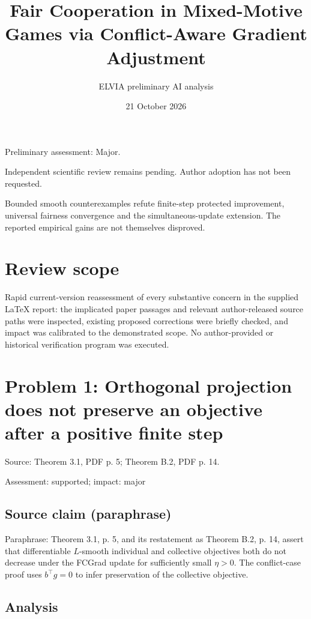 \documentclass[11pt]{article}
\begin{document}
\title{Fair Cooperation in Mixed-Motive Games via Conflict-Aware Gradient Adjustment}

\author{ELVIA preliminary AI analysis}\date{21 October 2026}\maketitle

Preliminary assessment: Major.\par

Independent scientific review remains pending. Author adoption has not been requested.

Bounded smooth counterexamples refute finite-step protected improvement, universal fairness convergence and the simultaneous-update extension. The reported empirical gains are not themselves disproved.

\section*{Review scope}

Rapid current-version reassessment of every substantive concern in the supplied LaTeX report: the implicated paper passages and relevant author-released source paths were inspected, existing proposed corrections were briefly checked, and impact was calibrated to the demonstrated scope. No author-provided or historical verification program was executed.

\section*{Problem 1: Orthogonal projection does not preserve an objective after a positive finite step}

Source: Theorem 3.1, PDF p. 5; Theorem B.2, PDF p. 14.

Assessment: supported; impact: major

\subsection*{Source claim (paraphrase)}

Paraphrase: Theorem 3.1, p. 5, and its restatement as Theorem B.2, p. 14, assert that differentiable \(L\)-smooth individual and collective objectives both do not decrease under the FCGrad update for sufficiently small \(\eta>0\). The conflict-case proof uses \(b^\top g=0\) to infer preservation of the collective objective.

\subsection*{Analysis}
\end{document}
